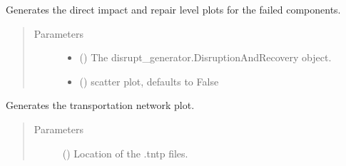 \documentclass[letterpaper,10pt,english]{sphinxmanual}
\begin{document}
\begin{fulllineitems}
\label{\detokenize{apidoc:dreaminsg_integrated_model.src.plots.plot_repair_curves}}
\sphinxAtStartPar
Generates the direct impact and repair level plots for the failed components.
\begin{quote}\begin{description}
\item[{Parameters}] \leavevmode\begin{itemize}
\item {} 
\sphinxAtStartPar
{} () \textendash{} The disrupt\_generator.DisruptionAndRecovery object.

\item {} 
\sphinxAtStartPar
{} (\sphinxstyleliteralemphasis{\sphinxupquote{, }}) \textendash{} scatter plot, defaults to False

\end{itemize}

\end{description}\end{quote}

\end{fulllineitems}


\begin{fulllineitems}
\label{\detokenize{apidoc:dreaminsg_integrated_model.src.plots.plot_transpo_net}}
\sphinxAtStartPar
Generates the transportation network plot.
\begin{quote}\begin{description}
\item[{Parameters}] \leavevmode
\sphinxAtStartPar
{} () \textendash{} Location of the .tntp files.

\end{description}\end{quote}

\end{fulllineitems}
\end{document}
